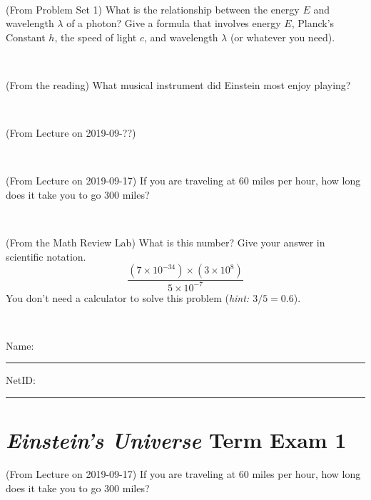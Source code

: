 \documentclass[12pt, letterpaper]{article}
\begin{document}
\vfill ~

\begin{problem} (From Problem Set 1)
What is the relationship between the energy $E$ and wavelength
$\lambda$ of a photon? Give a formula that involves energy $E$,
Planck's Constant $h$, the speed of light $c$, and wavelength
$\lambda$ (or whatever you need).
\end{problem}

\vfill ~


\clearpage


\begin{problem} (From the reading)
What musical instrument did Einstein most enjoy playing?
\end{problem}


\vfill ~

\begin{problem} (From Lecture on 2019-09-??)
\end{problem}


\vfill ~

\begin{problem} (From Lecture on 2019-09-17)
If you are traveling at 60 miles per hour, how long does
it take you to go 300 miles?
\end{problem}


\vfill ~

\begin{problem} (From the Math Review Lab)
What is this number? Give your answer in scientific notation.
$$
\frac{(7\times10^{-34})\times(3\times10^8)}{5\times10^{-7}}
$$
You don't need a calculator to solve this problem (\textit{hint: $3/5=0.6$}).
\end{problem}


\vfill ~


\cleardoublepage



\noindent
Name: \rule[-1ex]{0.60\textwidth}{0.1pt}
NetID: \rule[-1ex]{0.20\textwidth}{0.1pt}

\section*{\textsl{Einstein's Universe} Term Exam 1}
\setcounter{problem}{1}


\begin{problem} (From Lecture on 2019-09-17)
If you are traveling at 60 miles per hour, how long does
it take you to go 300 miles?
\end{problem}


\vfill ~
\end{document}
